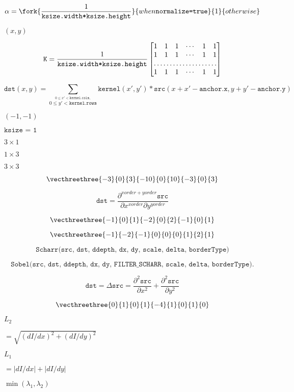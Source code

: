 \documentclass{article}
\begin{document}
\[\alpha = \fork{\frac{1}{\texttt{ksize.width*ksize.height}}}{when \texttt{normalize=true}}{1}{otherwise}\]
\pagebreak

$ (x, y) $
\pagebreak

\[\texttt{K} = \frac{1}{\texttt{ksize.width*ksize.height}} \begin{bmatrix} 1 & 1 & 1 & \cdots & 1 & 1 \\ 1 & 1 & 1 & \cdots & 1 & 1 \\ \hdotsfor{6} \\ 1 & 1 & 1 & \cdots & 1 & 1 \\ \end{bmatrix}\]
\pagebreak

\[\texttt{dst} (x,y) = \sum _{ \stackrel{0\leq x' < \texttt{kernel.cols},}{0\leq y' < \texttt{kernel.rows}} } \texttt{kernel} (x',y')* \texttt{src} (x+x'- \texttt{anchor.x} ,y+y'- \texttt{anchor.y} )\]
\pagebreak

$(-1,-1)$
\pagebreak

$\texttt{ksize = 1}$
\pagebreak

$3 \times 1$
\pagebreak

$1 \times 3$
\pagebreak

$3\times3$
\pagebreak

\[\vecthreethree{-3}{0}{3}{-10}{0}{10}{-3}{0}{3}\]
\pagebreak

\[\texttt{dst} = \frac{\partial^{xorder+yorder} \texttt{src}}{\partial x^{xorder} \partial y^{yorder}}\]
\pagebreak

\[\vecthreethree{-1}{0}{1}{-2}{0}{2}{-1}{0}{1}\]
\pagebreak

\[\vecthreethree{-1}{-2}{-1}{0}{0}{0}{1}{2}{1}\]
\pagebreak

\[\texttt{Scharr(src, dst, ddepth, dx, dy, scale, delta, borderType)}\]
\pagebreak

\[\texttt{Sobel(src, dst, ddepth, dx, dy, FILTER_SCHARR, scale, delta, borderType)} .\]
\pagebreak

\[\texttt{dst} = \Delta \texttt{src} = \frac{\partial^2 \texttt{src}}{\partial x^2} + \frac{\partial^2 \texttt{src}}{\partial y^2}\]
\pagebreak

\[\vecthreethree {0}{1}{0}{1}{-4}{1}{0}{1}{0}\]
\pagebreak

$L_2$
\pagebreak

$=\sqrt{(dI/dx)^2 + (dI/dy)^2}$
\pagebreak

$L_1$
\pagebreak

$=|dI/dx|+|dI/dy|$
\pagebreak

$\min(\lambda_1, \lambda_2)$
\pagebreak
\end{document}
